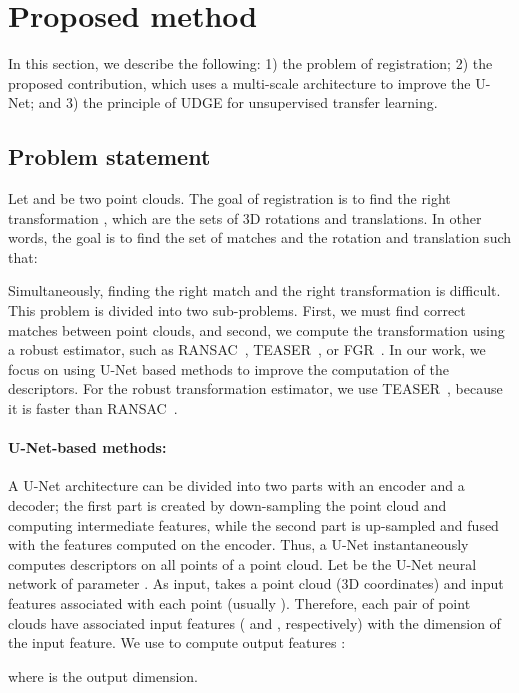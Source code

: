 \documentclass[10pt,twocolumn,letterpaper]{article}
\begin{document}
\section{Proposed method}


In this section, we describe the following: 1) the problem of registration; 2) the proposed contribution, which uses a multi-scale architecture to improve the U-Net; and 3) the principle of UDGE for unsupervised transfer learning.

\subsection{Problem statement}
Let  and  be two point clouds. The goal of registration is to find the right transformation , which are the sets of 3D rotations and translations. 
In other words, the goal is to find the set of matches  and the rotation and translation such that:
{\small

}


Simultaneously, finding the right match and the right transformation is difficult. This problem is divided into two sub-problems. First, we must find correct matches between point clouds, and second, we compute the transformation using a robust estimator, such as RANSAC~\cite{fischler_bolles_1981}, TEASER~\cite{yang2020teaser}, or FGR~\cite{leibe_fast_2016}. 
In our work, we focus on using U-Net based methods to improve the computation of the descriptors. 
For the robust transformation estimator, we use TEASER~\cite{yang2020teaser}, because it is faster than RANSAC~\cite{fischler_bolles_1981}. 

\paragraph{U-Net-based methods:}
A U-Net architecture can be divided into two parts with an encoder and a decoder; the first part is created by down-sampling the point cloud and computing intermediate features, while the second part is up-sampled and fused with the features computed on the encoder.
Thus, a U-Net instantaneously computes descriptors on all points of a point cloud.
Let  be the U-Net neural network of parameter . As input,  takes a point cloud (3D coordinates) and input features associated with each point (usually ). Therefore, each pair of point clouds  have associated input features ( and , respectively) with  the dimension of the input feature. We use  to compute output features :

where  is the output dimension.
\end{document}
